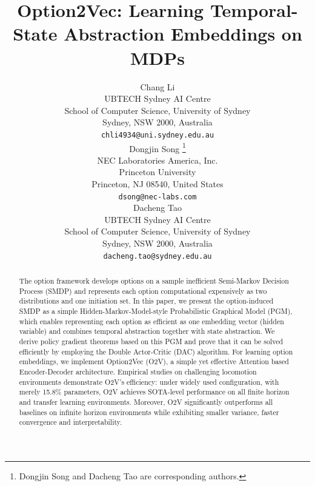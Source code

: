 \documentclass{article}
\title{Option2Vec: Learning Temporal-State Abstraction Embeddings
  on MDPs}
\author{%
  Chang Li\\
  UBTECH Sydney AI Centre\\
  School of Computer Science, University of Sydney\\
  Sydney, NSW 2000, Australia\\
  \texttt{chli4934@uni.sydney.edu.au}\\
\And
Dongjin Song \thanks{Dongjin Song and Dacheng Tao are corresponding authors.} \\
NEC Laboratories America, Inc.\\
Princeton University\\
Princeton, NJ 08540, United States\\
\texttt{dsong@nec-labs.com} \\
\AND
Dacheng Tao \footnotemark[1]\\
  UBTECH Sydney AI Centre\\
  School of Computer Science, University of Sydney\\
  Sydney, NSW 2000, Australia\\
  \texttt{dacheng.tao@sydney.edu.au}
}
\begin{document}
\maketitle

\begin{abstract}
  The option framework develops options on a sample inefficient
  Semi-Markov Decision Process (SMDP) and represents each option
  computational expensively as two distributions and one
  initiation set. In this paper, we present the option-induced
  SMDP as a simple Hidden-Markov-Model-style Probabilistic
  Graphical Model (PGM), which enables representing each option
  as efficient as one embedding vector (hidden variable) and
  combines temporal abstraction together with state abstraction.
  We derive policy gradient theorems based on this PGM and prove
  that it can be solved efficiently by employing the Double
  Actor-Critic (DAC) algorithm. For learning option embeddings,
  we implement Option2Vec (O2V), a simple yet effective Attention
  based Encoder-Decoder architecture. Empirical studies on
  challenging locomotion environments demonstrate O2V's
  efficiency: under widely used configuration, with merely 15.8\%
  parameters, O2V achieves SOTA-level performance on all finite
  horizon and transfer learning environments. Moreover, O2V
  significantly outperforms all baselines on infinite horizon
  environments while exhibiting smaller variance, faster
  convergence and interpretability.

  
\end{abstract}
\end{document}

